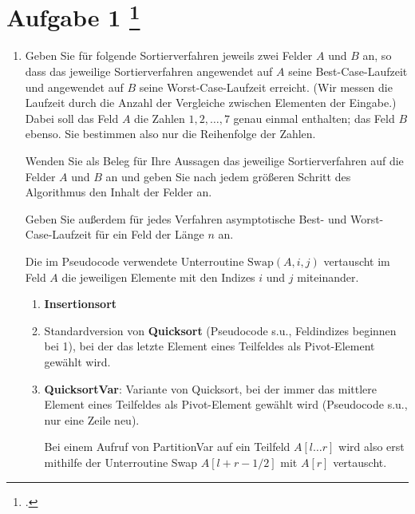 \documentclass{lehramt-informatik-aufgabe}
\begin{document}
\section{Aufgabe 1
\footcite{66115:2021:03}}

\begin{enumerate}


\item Geben Sie für folgende Sortierverfahren jeweils zwei Felder $A$
und $B$ an, so dass das jeweilige Sortierverfahren angewendet auf $A$
seine Best-Case-Laufzeit und angewendet auf $B$ seine
Worst-Case-Laufzeit erreicht. (Wir messen die Laufzeit durch die Anzahl
der Vergleiche zwischen Elementen der Eingabe.) Dabei soll das Feld $A$
die Zahlen $1,2,\dots,7$ genau einmal enthalten; das Feld $B$ ebenso.
Sie bestimmen also nur die Reihenfolge der Zahlen.

Wenden Sie als Beleg für Ihre Aussagen das jeweilige Sortierverfahren
auf die Felder $A$ und $B$ an und geben Sie nach jedem größeren Schritt
des Algorithmus den Inhalt der Felder an.

Geben Sie außerdem für jedes Verfahren asymptotische Best- und
Worst-Case-Laufzeit für ein Feld der Länge $n$ an.

Die im Pseudocode verwendete Unterroutine $\text{Swap} (A,i,j)$
vertauscht im Feld $A$ die jeweiligen Elemente mit den Indizes $i$ und
$j$ miteinander.
\begin{enumerate}


\item \textbf{Insertionsort}


\item Standardversion von \textbf{Quicksort} (Pseudocode s.u.,
Feldindizes beginnen bei 1), bei der das letzte Element eines Teilfeldes
als Pivot-Element gewählt wird.


\item \textbf{QuicksortVar}: Variante von Quicksort, bei der immer das
mittlere Element eines Teilfeldes als Pivot-Element gewählt wird
(Pseudocode s.u., nur eine Zeile neu).

Bei einem Aufruf von PartitionVar auf ein Teilfeld $A[l \dots r]$ wird
also erst mithilfe der Unterroutine Swap $A[l + r - 1 / 2]$ mit $A[r]$
vertauscht.


\end{enumerate}
\end{enumerate}
\end{document}
